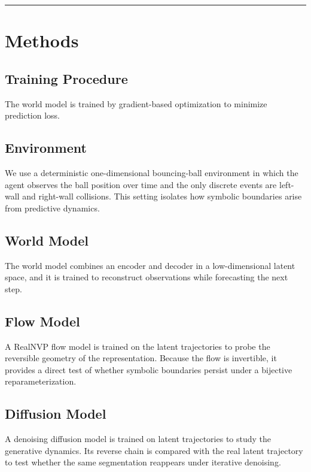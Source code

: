 \documentclass[11pt]{article}
\begin{document}
\bigskip\hrule\bigskip

\section{Methods}

\subsection{Training Procedure}

The world model is trained by gradient-based optimization to minimize prediction loss.

\subsection{Environment}

We use a deterministic one-dimensional bouncing-ball environment in which the agent observes the ball position over time and the only discrete events are left-wall and right-wall collisions. This setting isolates how symbolic boundaries arise from predictive dynamics.

\subsection{World Model}

The world model combines an encoder and decoder in a low-dimensional latent space, and it is trained to reconstruct observations while forecasting the next step.

\subsection{Flow Model}

A RealNVP flow model is trained on the latent trajectories to probe the reversible geometry of the representation. Because the flow is invertible, it provides a direct test of whether symbolic boundaries persist under a bijective reparameterization.

\subsection{Diffusion Model}

A denoising diffusion model is trained on latent trajectories to study the generative dynamics. Its reverse chain is compared with the real latent trajectory to test whether the same segmentation reappears under iterative denoising.
\end{document}
